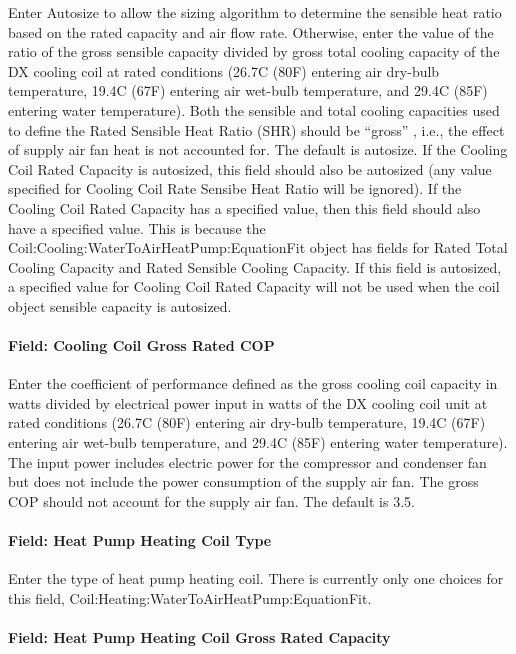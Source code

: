 Enter Autosize to allow the sizing algorithm to determine the sensible heat ratio based on the rated capacity and air flow rate. Otherwise, enter the value of the ratio of the gross sensible capacity divided by gross total cooling capacity of the DX cooling coil at rated conditions (26.7C (80F) entering air dry-bulb temperature, 19.4C (67F) entering air wet-bulb temperature, and 29.4C (85F) entering water temperature). Both the sensible and total cooling capacities used to define the Rated Sensible Heat Ratio (SHR) should be ``gross'' , i.e., the effect of supply air fan heat is not accounted for. The default is autosize. If the Cooling Coil Rated Capacity is autosized, this field should also be autosized (any value specified for Cooling Coil Rate Sensibe Heat Ratio will be ignored). If the Cooling Coil Rated Capacity has a specified value, then this field should also have a specified value. This is because the Coil:Cooling:WaterToAirHeatPump:EquationFit object has fields for Rated Total Cooling Capacity and Rated Sensible Cooling Capacity. If this field is autosized, a specified value for Cooling Coil Rated Capacity will not be used when the coil object sensible capacity is autosized.

\paragraph{Field: Cooling Coil Gross Rated COP}\label{field-cooling-coil-gross-rated-cop-1}

Enter the coefficient of performance defined as the gross cooling coil capacity in watts divided by electrical power input in watts of the DX cooling coil unit at rated conditions (26.7C (80F) entering air dry-bulb temperature, 19.4C (67F) entering air wet-bulb temperature, and 29.4C (85F) entering water temperature). The input power includes electric power for the compressor and condenser fan but does not include the power consumption of the supply air fan. The gross COP should not account for the supply air fan. The default is 3.5.

\paragraph{Field: Heat Pump Heating Coil Type}\label{field-heat-pump-heating-coil-type-1}

Enter the type of heat pump heating coil. There is currently only one choices for this field, Coil:Heating:WaterToAirHeatPump:EquationFit.

\paragraph{Field: Heat Pump Heating Coil Gross Rated Capacity}\label{field-heat-pump-heating-coil-gross-rated-capacity-1}

